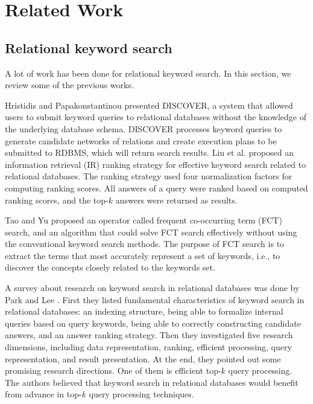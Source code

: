 \chapter{Related Work}

\section{Relational keyword search}
A lot of work has been done for relational keyword search. In this section, we review some of the previous works.

 Hristidis and Papakonstantinou \cite{hristidis2002discover} presented DISCOVER, a system that allowed users to submit keyword queries to relational databases without the knowledge of the underlying database schema. DISCOVER processes keyword queries to generate candidate networks of relations and create execution plans to be submitted to RDBMS, which will return search results.
Liu et al. \cite{liu2006effective} proposed an information retrieval (IR) ranking strategy for effective keyword search related to relational databases. The ranking strategy used four normalization factors for computing ranking scores. 
All answers of a query were ranked based on computed ranking scores, and the top-$k$ answers were returned as results.

 Tao and Yu \cite{tao2009finding} proposed an operator called frequent co-occurring term (FCT) search, and an algorithm that could solve FCT search effectively without using the conventional keyword search methods. The purpose of FCT search is to extract the terms that most accurately represent a set of keywords, i.e., to discover the concepts closely related to the keywords set.

 A survey about research on keyword search in relational databases was done by Park and Lee \cite{park2011keyword}. First they listed fundamental characteristics of keyword search in relational databases: an indexing structure, being able to formalize internal queries based on query keywords, being able to correctly constructing candidate answers, and an answer ranking strategy. Then they investigated five research dimensions, including data representation, ranking, efficient processing, query representation, and result presentation. At the end, they pointed out some promising research directions. One of them is efficient top-$k$ query processing. The authors believed that keyword search in relational databases would benefit from advance in top-$k$ query processing techniques.


